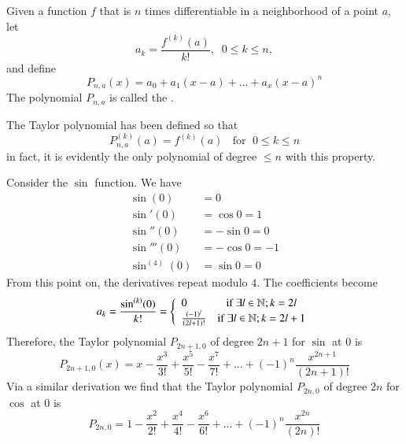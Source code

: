 \documentclass[12pt, a4paper, oneside, openright, titlepage]{book}
\begin{document}
\begin{defn}
    Given a function $f$ that is $n$ times differentiable in a neighborhood of a point $a$, let \begin{equation*}
        a_k = \frac{f^{(k)}(a)}{k!},\;\;0\leq k \leq n,
    \end{equation*}
    and define \begin{equation*}
        P_{n,a}(x) = a_0 + a_1(x-a) + \hdots + a_x(x-a)^n
    \end{equation*}
    The polynomial $P_{n,a}$ is called the . 
\end{defn}

\begin{rmk}
    The Taylor polynomial has been defined so that \begin{equation*}
        P_{n,a}^{(k)}(a) = f^{(k)}(a)\;\;\text{ for }\;0\leq k \leq n
    \end{equation*}
    in fact, it is evidently the only polynomial of degree $\leq n$ with this property.
\end{rmk}

\begin{eg}
    Consider the $\sin$ function. We have \begin{align*}
        \sin(0) &= 0 \\
        \sin'(0) &= \cos 0 = 1 \\
        \sin''(0) &= -\sin 0 = 0 \\
        \sin'''(0) &= -\cos 0 = -1 \\
        \sin^{(4)}(0) &= \sin 0 = 0
    \end{align*}
    From this point on, the derivatives repeat modulo $4$. The coefficients become \begin{equation*}
        a_k = \frac{\sin^{(k)}(0)}{k!} = \left\{\begin{array}{lc} 0 & \text{if } \exists l \in \mathbb N; k = 2l \\
            \frac{(-1)^{l}}{(2l+1)!} & \text{if } \exists l \in \mathbb N; k = 2l+1
        \end{array}\right.
    \end{equation*}
    Therefore, the Taylor polynomial $P_{2n+1,0}$ of degree $2n+1$ for $\sin$ at $0$ is \begin{equation*}
        P_{2n+1,0}(x) = x-\frac{x^3}{3!}+\frac{x^5}{5!} - \frac{x^7}{7!}+\hdots + (-1)^n\frac{x^{2n+1}}{(2n+1)!}
    \end{equation*}
    Via a similar derivation we find that the Taylor polynomial $P_{2n,0}$ of degree $2n$ for $\cos$ at $0$ is \begin{equation*}
        P_{2n,0} = 1 - \frac{x^2}{2!} + \frac{x^4}{4!} - \frac{x^6}{6!} + \hdots + (-1)^n\frac{x^{2n}}{(2n)!}
    \end{equation*}
\end{eg}
\end{document}
